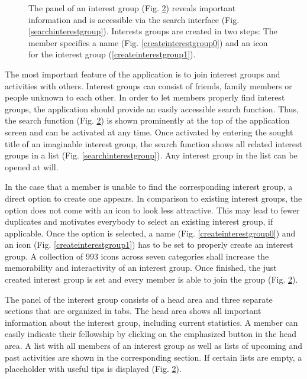 \documentclass[12pt,numbers=noenddot,parskip,bibliography=totocnumbered,listof=totocnumbered,draft]{scrreprt}
\begin{document}
\begin{figure}
\begin{subfigure}[t]{0.45\textwidth}
\caption{}
\label{interestgroup}
\end{subfigure}%
\caption[Organization of interest groups]{The panel of an interest group (Fig. \ref{interestgroup}) reveals important information and is accessible via the search interface (Fig. \ref{searchinterestgroup}). Interests groups are created in two steps: The member specifies a name (Fig. \ref{createinterestgroup0}) and an icon for the interest group (\ref{createinterestgroup1}).}
\end{figure}

The most important feature of the application is to join interest groups and activities with others. Interest groups can consist of friends, family members or people unknown to each other. In order to let members properly find interest groups, the application should provide an easily accessible search function. Thus, the search function (Fig. \ref{interestgroup}) is shown prominently at the top of the application screen and can be activated at any time. Once activated by entering the sought title of an imaginable interest group, the search function shows all related interest groups in a list (Fig. \ref{searchinterestgroup}). Any interest group in the list can be opened at will.

In the case that a member is unable to find the corresponding interest group, a direct option to create one appears. In comparison to existing interest groups, the option does not come with an icon to look less attractive. This may lead to fewer duplicates and motivates everybody to select an existing interest group, if applicable. Once the option is selected, a name (Fig. \ref{createinterestgroup0}) and an icon (Fig. \ref{createinterestgroup1}) has to be set to properly create an interest group. A collection of 993 icons across seven categories shall increase the memorability and interactivity of an interest group. Once finished, the just created interest group is set and every member is able to join the group (Fig. \ref{interestgroup}).

The panel of the interest group consists of a head area and three separate sections that are organized in tabs. The head area shows all important information about the interest group, including current statistics. A member can easily indicate their fellowship by clicking on the emphasized button in the head area. A list with all members of an interest group as well as lists of upcoming and past activities are shown in the corresponding section. If certain lists are empty, a placeholder with useful tips is displayed (Fig. \ref{interestgroup}).
\end{document}
